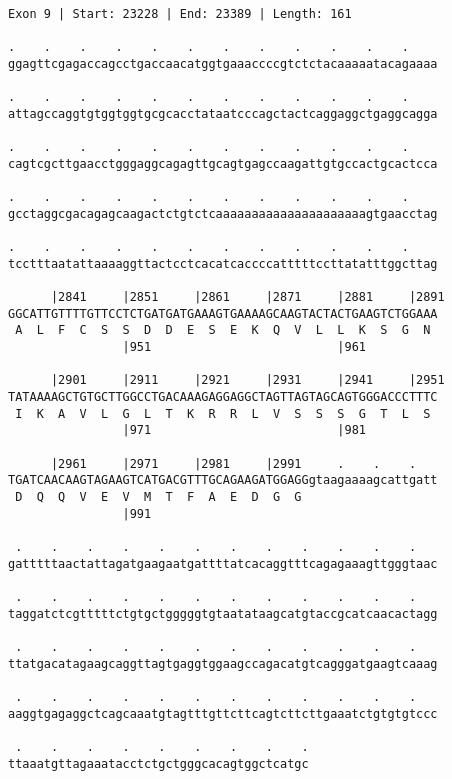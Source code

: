 \documentclass{article}
\begin{document}
\begin{Verbatim}[fontfamily=courier]
Exon 9 | Start: 23228 | End: 23389 | Length: 161

.    .    .    .    .    .    .    .    .    .    .    .    
ggagttcgagaccagcctgaccaacatggtgaaaccccgtctctacaaaaatacagaaaa

.    .    .    .    .    .    .    .    .    .    .    .    
attagccaggtgtggtggtgcgcacctataatcccagctactcaggaggctgaggcagga

.    .    .    .    .    .    .    .    .    .    .    .    
cagtcgcttgaacctgggaggcagagttgcagtgagccaagattgtgccactgcactcca

.    .    .    .    .    .    .    .    .    .    .    .    
gcctaggcgacagagcaagactctgtctcaaaaaaaaaaaaaaaaaaaaagtgaacctag

.    .    .    .    .    .    .    .    .    .    .    .    
tcctttaatattaaaaggttactcctcacatcaccccatttttccttatatttggcttag

      |2841     |2851     |2861     |2871     |2881     |2891
GGCATTGTTTTGTTCCTCTGATGATGAAAGTGAAAAGCAAGTACTACTGAAGTCTGGAAA
 A  L  F  C  S  S  D  D  E  S  E  K  Q  V  L  L  K  S  G  N 
                |951                          |961          

      |2901     |2911     |2921     |2931     |2941     |2951
TATAAAAGCTGTGCTTGGCCTGACAAAGAGGAGGCTAGTTAGTAGCAGTGGGACCCTTTC
 I  K  A  V  L  G  L  T  K  R  R  L  V  S  S  S  G  T  L  S 
                |971                          |981          

      |2961     |2971     |2981     |2991     .    .    .   
TGATCAACAAGTAGAAGTCATGACGTTTGCAGAAGATGGAGGgtaagaaaagcattgatt
 D  Q  Q  V  E  V  M  T  F  A  E  D  G  G                   
                |991                                        

 .    .    .    .    .    .    .    .    .    .    .    .   
gatttttaactattagatgaagaatgattttatcacaggtttcagagaaagttgggtaac

 .    .    .    .    .    .    .    .    .    .    .    .   
taggatctcgtttttctgtgctgggggtgtaatataagcatgtaccgcatcaacactagg

 .    .    .    .    .    .    .    .    .    .    .    .   
ttatgacatagaagcaggttagtgaggtggaagccagacatgtcagggatgaagtcaaag

 .    .    .    .    .    .    .    .    .    .    .    .   
aaggtgagaggctcagcaaatgtagtttgttcttcagtcttcttgaaatctgtgtgtccc

 .    .    .    .    .    .    .    .    .
ttaaatgttagaaatacctctgctgggcacagtggctcatgc
\end{Verbatim}
\end{document}
